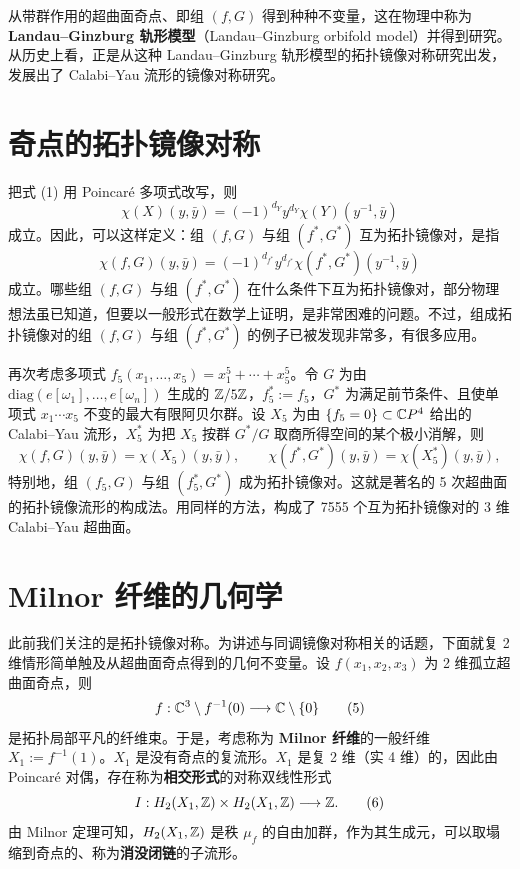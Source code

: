从带群作用的超曲面奇点、即组 $(f,G)$ 得到种种不变量，这在物理中称为\textbf{Landau--Ginzburg 轨形模型}（Landau--Ginzburg orbifold model）并得到研究。从历史上看，正是从这种 Landau--Ginzburg 轨形模型的拓扑镜像对称研究出发，发展出了 Calabi--Yau 流形的镜像对称研究。

\section{奇点的拓扑镜像对称}

把式 (1) 用 Poincaré 多项式改写，则
%
\[
  \chi(X)(y,\bar y)=(-1)^{d_Y}y^{d_Y}\chi(Y)(y^{-1},\bar y)
\]
%
成立。因此，可以这样定义：组 $(f,G)$ 与组 $(f^*,G^*)$ 互为拓扑镜像对，是指
%
\[
  \chi(f,G)(y,\bar y)=(-1)^{d_{f^*}}y^{d_{f^*}}\chi(f^*,G^*)(y^{-1},\bar y)
\]
%
成立。哪些组 $(f,G)$ 与组 $(f^*,G^*)$
在什么条件下互为拓扑镜像对，部分物理想法虽已知道，但要以一般形式在数学上证明，是非常困难的问题。不过，组成拓扑镜像对的组 $(f,G)$ 与组 $(f^*,G^*)$ 的例子已被发现非常多，有很多应用。

再次考虑多项式 $f_5(x_1,\dots,x_5)=x_1^5+\cdots+x_5^5$。令 $G$ 为由 $\mathrm{diag}(e[\omega_1],\dots,e[\omega_n])$ 生成的 $\mathbb{Z}/5\mathbb{Z}$，$f_5^*:=f_5$，$G^*$ 为满足前节条件、且使单项式 $x_1\cdots x_5$ 不变的最大有限阿贝尔群。设 $X_5$ 为由 $\{f_5=0\}\subset\mathbb{C}P^4$ 给出的 Calabi--Yau 流形，$X_5^*$ 为把 $X_5$ 按群 $G^*/G$ 取商所得空间的某个极小消解，则
%
\[
  \chi(f,G)(y,\bar y)=\chi(X_5)(y,\bar y),\qquad
  \chi(f^*,G^*)(y,\bar y)=\chi(X_5^*)(y,\bar y),
\]
%
特别地，组 $(f_5,G)$ 与组 $(f_5^*,G^*)$ 成为拓扑镜像对。这就是著名的 5 次超曲面的拓扑镜像流形的构成法。用同样的方法，构成了 7555 个互为拓扑镜像对的 3 维 Calabi--Yau 超曲面。

\section{Milnor 纤维的几何学}

此前我们关注的是拓扑镜像对称。为讲述与同调镜像对称相关的话题，下面就复 2 维情形简单触及从超曲面奇点得到的几何不变量。设 $f(x_1,x_2,x_3)$ 为 2 维孤立超曲面奇点，则
%
\begin{equation}
  f:\mathbb{C}^3\setminus f^{-1}(0)\longrightarrow\mathbb{C}\setminus\{0\}
  \tag{5}
\end{equation}
%
是拓扑局部平凡的纤维束。于是，考虑称为 \textbf{Milnor 纤维}的一般纤维 $X_1:=f^{-1}(1)$。$X_1$ 是没有奇点的复流形。$X_1$ 是复 2 维（实 4 维）的，因此由 Poincaré 对偶，存在称为\textbf{相交形式}的对称双线性形式
%
\begin{equation}
  I:H_2(X_1,\mathbb{Z})\times H_2(X_1,\mathbb{Z})\longrightarrow\mathbb{Z}.
  \tag{6}
\end{equation}
%
由 Milnor 定理可知，$H_2(X_1,\mathbb{Z})$ 是秩 $\mu_f$ 的自由加群，作为其生成元，可以取塌缩到奇点的、称为\textbf{消没闭链}的子流形。

